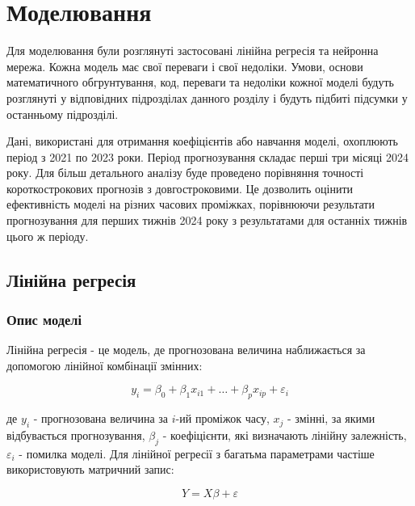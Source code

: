 \chapter{Моделювання}


Для моделювання були розглянуті застосовані лінійна регресія та нейронна мережа. 
Кожна модель має свої переваги і свої недоліки. 
Умови, основи математичного обгрунтування, код, переваги та недоліки кожної моделі будуть розглянуті у відповідних підрозділах данного розділу і будуть підбиті підсумки у останньому підрозділі.

Дані, використані для отримання коефіцієнтів або навчання моделі, охоплюють період з 2021 по 2023 роки. 
Період прогнозування складає перші три місяці 2024 року. 
Для більш детального аналізу буде проведено порівняння точності короткострокових прогнозів з довгостроковими. 
Це дозволить оцінити ефективність моделі на різних часових проміжках, порівнюючи результати прогнозування для перших тижнів 2024 року з результатами для останніх тижнів цього ж періоду.

\section{Лінійна регресія}

\subsection{Опис моделі}

Лінійна регресія - це модель, де прогнозована величина наближається за допомогою лінійної комбінації змінних:

$$y_i = \beta_0 + \beta_1 x_{i 1} + \dots + \beta_p x_{i p} + \varepsilon_i$$

де $y_i$ - прогнозована величина за $i$-ий проміжок часу, $x_j$ - змінні, за якими відбувається прогнозування, $\beta_j$ - коефіцієнти, які визначають лінійну залежність, $\varepsilon_i$ - помилка моделі.\cite{linear_reg} 
Для лінійної регресії з багатьма параметрами частіше використовують матричний запис:

$$Y = X\beta + \varepsilon$$

